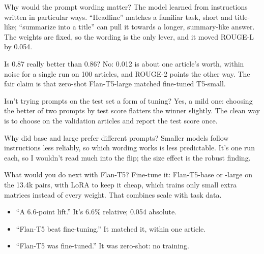 \begin{iq}[\core]{Why would the prompt wording matter?}
The model learned from instructions written in particular ways. ``Headline'' matches a familiar task, short and title-like; ``summarize into a title'' can pull it towards a longer, summary-like answer. The weights are fixed, so the wording is the only lever, and it moved ROUGE-L by 0.054.
\end{iq}

\begin{iq}[\core]{Is 0.87 really better than 0.86?}
No: 0.012 is about one article's worth, within noise for a single run on 100 articles, and ROUGE-2 points the other way. The fair claim is that zero-shot Flan-T5-large matched fine-tuned T5-small.
\end{iq}

\begin{iq}{Isn't trying prompts on the test set a form of tuning?}
Yes, a mild one: choosing the better of two prompts by test score flatters the winner slightly. The clean way is to choose on the validation articles and report the test score once.
\end{iq}

\begin{iq}{Why did base and large prefer different prompts?}
Smaller models follow instructions less reliably, so which wording works is less predictable. It's one run each, so I wouldn't read much into the flip; the size effect is the robust finding.
\end{iq}

\begin{iq}{What would you do next with Flan-T5?}
Fine-tune it: Flan-T5-base or -large on the 13.4k pairs, with LoRA to keep it cheap, which trains only small extra matrices instead of every weight. That combines scale with task data.
\end{iq}

\begin{bugfix}
\begin{itemize}
  \item ``A 6.6-point lift.'' It's 6.6\% relative; 0.054 absolute.
  \item ``Flan-T5 beat fine-tuning.'' It matched it, within one article.
  \item ``Flan-T5 was fine-tuned.'' It was zero-shot: no training.
\end{itemize}
\end{bugfix}
